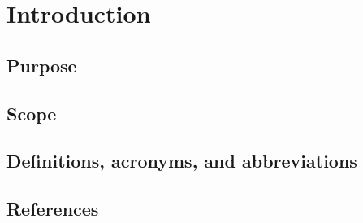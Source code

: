 \section{Introduction}

\subsection{Purpose}


\subsection{Scope}


\subsection{Definitions, acronyms, and abbreviations}


\subsection{References}


